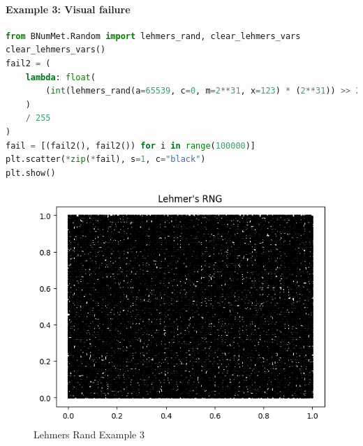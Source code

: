 \paragraph{Example 3: Visual failure}{
\begin{lstlisting}[language=Python]
from BNumMet.Random import lehmers_rand, clear_lehmers_vars
clear_lehmers_vars()
fail2 = (
    lambda: float(
        (int(lehmers_rand(a=65539, c=0, m=2**31, x=123) * (2**31)) >> 23) & 0xFF
    )
    / 255
)
fail = [(fail2(), fail2()) for i in range(100000)]
plt.scatter(*zip(*fail), s=1, c="black")
plt.show()
\end{lstlisting}
\begin{figure}[H]
    \centering
    \includegraphics{Include/Images/Thesis/Documentation/Randomness/Lehmers Rand Example 3.png}
    \caption{Lehmers Rand Example 3}
    \label{fig:Lehmers Rand Example 3}
\end{figure}
}
